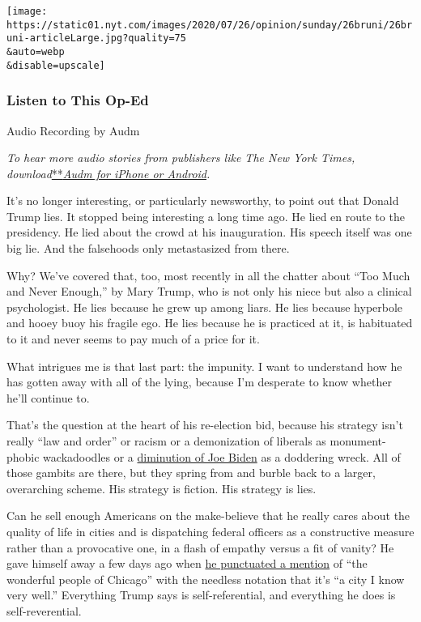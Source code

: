\texttt{[image: https://static01.nyt.com/images/2020/07/26/opinion/sunday/26bruni/26bruni-articleLarge.jpg?quality=75\\\&auto=webp\\\&disable=upscale]}

\hypertarget{listen-to-this-op-ed}{%
\subsubsection{Listen to This Op-Ed}\label{listen-to-this-op-ed}}

Audio Recording by Audm

\emph{To hear more audio stories from publishers like The New York
Times,
download}\href{https://www.audm.com/?utm_source=nytmag\&utm_medium=embed\&utm_campaign=left_behind_draper}{**}\href{https://www.audm.com/?utm_source=nytopinion\&utm_medium=embed\&utm_campaign=trump_history_cosmos}{\emph{Audm
for iPhone or Android}}\emph{.}

It's no longer interesting, or particularly newsworthy, to point out
that Donald Trump lies. It stopped being interesting a long time ago. He
lied en route to the presidency. He lied about the crowd at his
inauguration. His speech itself was one big lie. And the falsehoods only
metastasized from there.

Why? We've covered that, too, most recently in all the chatter about
``Too Much and Never Enough,'' by Mary Trump, who is not only his niece
but also a clinical psychologist. He lies because he grew up among
liars. He lies because hyperbole and hooey buoy his fragile ego. He lies
because he is practiced at it, is habituated to it and never seems to
pay much of a price for it.

What intrigues me is that last part: the impunity. I want to understand
how he has gotten away with all of the lying, because I'm desperate to
know whether he'll continue to.

That's the question at the heart of his re-election bid, because his
strategy isn't really ``law and order'' or racism or a demonization of
liberals as monument-phobic wackadoodles or a
\href{https://www.nytimes.com/2020/05/17/opinion/trump-biden-age.html}{diminution
of Joe Biden} as a doddering wreck. All of those gambits are there, but
they spring from and burble back to a larger, overarching scheme. His
strategy is fiction. His strategy is lies.

Can he sell enough Americans on the make-believe that he really cares
about the quality of life in cities and is dispatching federal officers
as a constructive measure rather than a provocative one, in a flash of
empathy versus a fit of vanity? He gave himself away a few days ago when
\href{https://www.whitehouse.gov/briefings-statements/remarks-president-trump-operation-legend-combatting-violent-crime-american-cities/}{he
punctuated a mention} of ``the wonderful people of Chicago'' with the
needless notation that it's ``a city I know very well.'' Everything
Trump says is self-referential, and everything he does is
self-reverential.

